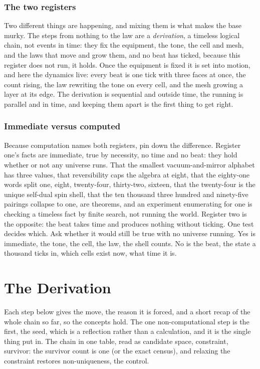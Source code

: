 \documentclass{article}
\begin{document}
\section{The two registers}

Two different things are happening, and mixing them is what makes the base murky. The steps from
nothing to the law are a \emph{derivation}, a timeless logical chain, not events in time: they fix
the equipment, the tone, the cell and mesh, and the laws that move and grow them, and no beat has
ticked, because this register does not run, it holds. Once the equipment is fixed it is set into
motion, and here the dynamics live: every beat is one tick with three faces at once, the count
rising, the law rewriting the tone on every cell, and the mesh growing a layer at its edge. The
derivation is sequential and outside time, the running is parallel and in time, and keeping them
apart is the first thing to get right.

\section{Immediate versus computed}

Because computation names both registers, pin down the difference. Register one's facts are
immediate, true by necessity, no time and no beat: they hold whether or not any universe runs.
That the smallest vacuum-and-mirror alphabet has three values, that reversibility caps the algebra
at eight, that the eighty-one words split one, eight, twenty-four, thirty-two, sixteen, that the
twenty-four is the unique self-dual spin shell, that the ten thousand three hundred and ninety-five
pairings collapse to one, are theorems, and an experiment enumerating for one is checking a
timeless fact by finite search, not running the world. Register two is the opposite: the beat
takes time and produces nothing without ticking. One test decides which. Ask whether it would
still be true with no universe running. Yes is immediate, the tone, the cell, the law, the shell
counts. No is the beat, the state a thousand ticks in, which cells exist now, what time it is.

\part{The Derivation}

Each step below gives the move, the reason it is forced, and a short recap of the whole chain so
far, so the concepts hold. The one non-computational step is the first, the seed, which is a
reflection rather than a calculation, and it is the single thing put in. The chain in one table,
read as candidate space, constraint, survivor: the survivor count is one (or the exact census),
and relaxing the constraint restores non-uniqueness, the control.
\end{document}
